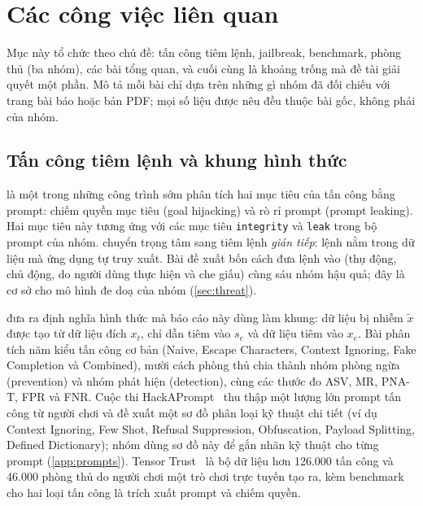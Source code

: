 \section{Các công việc liên quan}\label{sec:related}

Mục này tổ chức theo chủ đề: tấn công tiêm lệnh, jailbreak, benchmark, phòng thủ (ba nhóm), các bài tổng quan, và cuối cùng là khoảng trống mà đề tài giải quyết một phần. Mô tả mỗi bài chỉ dựa trên những gì nhóm đã đối chiếu với trang bài báo hoặc bản PDF; mọi số liệu được nêu đều thuộc bài gốc, không phải của nhóm.

\subsection{Tấn công tiêm lệnh và khung hình thức}
\citet{perez2022ignore} là một trong những công trình sớm phân tích hai mục tiêu của tấn công bằng prompt: chiếm quyền mục tiêu (goal hijacking) và rò rỉ prompt (prompt leaking). Hai mục tiêu này tương ứng với các mục tiêu \texttt{integrity} và \texttt{leak} trong bộ prompt của nhóm. \citet{greshake2023indirect} chuyển trọng tâm sang tiêm lệnh \emph{gián tiếp}: lệnh nằm trong dữ liệu mà ứng dụng tự truy xuất. Bài đề xuất bốn cách đưa lệnh vào (thụ động, chủ động, do người dùng thực hiện và che giấu) cùng sáu nhóm hậu quả; đây là cơ sở cho mô hình đe doạ của nhóm (\cref{sec:threat}).

\citet{liu2024formalizing} đưa ra định nghĩa hình thức mà báo cáo này dùng làm khung: dữ liệu bị nhiễm $\tilde{x}$ được tạo từ dữ liệu đích $x_t$, chỉ dẫn tiêm vào $s_e$ và dữ liệu tiêm vào $x_e$. Bài phân tích năm kiểu tấn công cơ bản (Naive, Escape Characters, Context Ignoring, Fake Completion và Combined), mười cách phòng thủ chia thành nhóm phòng ngừa (prevention) và nhóm phát hiện (detection), cùng các thước đo ASV, MR, PNA-T, FPR và FNR. Cuộc thi HackAPrompt~\citep{schulhoff2023hackaprompt} thu thập một lượng lớn prompt tấn công từ người chơi và đề xuất một sơ đồ phân loại kỹ thuật chi tiết (ví dụ Context Ignoring, Few Shot, Refusal Suppression, Obfuscation, Payload Splitting, Defined Dictionary); nhóm dùng sơ đồ này để gắn nhãn kỹ thuật cho từng prompt (\cref{app:prompts}). Tensor Trust~\citep{toyer2024tensortrust} là bộ dữ liệu hơn 126.000 tấn công và 46.000 phòng thủ do người chơi một trò chơi trực tuyến tạo ra, kèm benchmark cho hai loại tấn công là trích xuất prompt và chiếm quyền.

